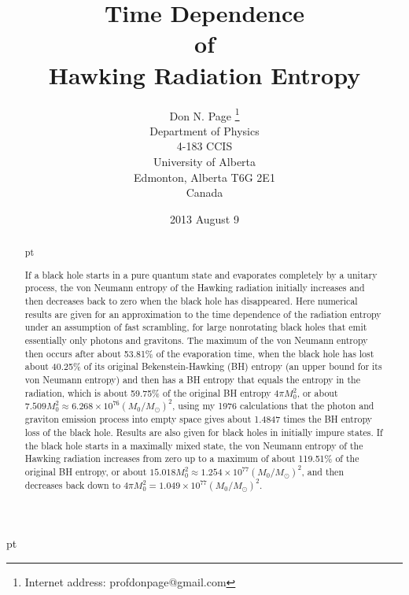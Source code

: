 \documentclass[12pt]{article}
\begin{document}
\title{{\bf Time Dependence\\ of\\ Hawking Radiation Entropy}}

\author{
Don N. Page
\thanks{Internet address:
profdonpage@gmail.com}
\\
Department of Physics\\
4-183 CCIS\\
University of Alberta\\
Edmonton, Alberta T6G 2E1\\
Canada
}

\date{2013 August 9}

\maketitle
\large
\begin{abstract}
 pt

If a black hole starts in a pure quantum state and evaporates completely by a unitary process, the von Neumann entropy of the Hawking radiation initially increases and then decreases back to zero when the black hole has disappeared.  Here numerical results are given for an approximation to the time dependence of the radiation entropy under an assumption of fast scrambling, for large nonrotating black holes that emit essentially only photons and gravitons.  The maximum of the von Neumann entropy then occurs after about 53.81\% of the evaporation time, when the black hole has lost about 40.25\% of its original Bekenstein-Hawking (BH) entropy (an upper bound for its von Neumann entropy) and then has a BH entropy that equals the entropy in the radiation, which is about 59.75\% of the original BH entropy $4\pi M_0^2$, or about $7.509 M_0^2 \approx 6.268\times 10^{76}(M_0/M_\odot)^2$, using my 1976 calculations that the photon and graviton emission process into empty space gives about 1.4847 times the BH entropy loss of the black hole. Results are also given for black holes in initially impure states.  If the black hole starts in a maximally mixed state, the von Neumann entropy of the Hawking radiation increases from zero up to a maximum of about 119.51\% of the original BH entropy, or about $15.018 M_0^2 \approx 1.254\times 10^{77}(M_0/M_\odot)^2$, and then decreases back down to $4\pi M_0^2 = 1.049\times 10^{77}(M_0/M_\odot)^2$.

\end{abstract}


 pt
\end{document}
